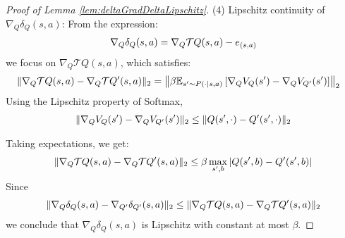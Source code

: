 \begin{proof}[Proof of Lemma \ref{lem:deltaGradDeltaLipschitz}]
\noindent (4) Lipschitz continuity of \( \nabla_Q \delta_Q(s,a) \):  
From the expression:
\begin{align}
    \nabla_Q \delta_Q(s,a) = \nabla_Q \mathcal{T}Q(s,a) - e_{(s,a)} \notag
\end{align}
we focus on \( \nabla_Q \mathcal{T}Q(s,a) \), which satisfies:
\begin{align}
    \|\nabla_Q \mathcal{T}Q(s,a) - \nabla_Q \mathcal{T}Q'(s,a)\|_2 &= \left\|\beta \mathbb{E}_{s' \sim P(\cdot \mid s,a)} \left[\nabla_Q V_Q(s') - \nabla_Q V_{Q'}(s') \right] \right\|_2 \notag
\end{align}
Using the Lipschitz property of Softmax,
\begin{align}
    \|\nabla_Q V_Q(s') - \nabla_Q V_{Q'}(s')\|_2 \leq \|Q(s',\cdot) - Q'(s',\cdot)\|_2 \notag
\end{align}


Taking expectations, we get:
\begin{align}
    \|\nabla_Q \mathcal{T}Q(s,a) - \nabla_Q \mathcal{T}Q'(s,a)\|_2 \leq \beta \max_{s',b} |Q(s',b) - Q'(s',b)| \notag
\end{align}
Since
\begin{align}
    \|\nabla_Q \delta_Q(s,a) - \nabla_{Q'} \delta_{Q'}(s,a)\|_2 \leq \|\nabla_Q \mathcal{T}Q(s,a) - \nabla_Q \mathcal{T}Q'(s,a)\|_2 \notag
\end{align}
we conclude that \( \nabla_Q \delta_Q(s,a) \) is Lipschitz with constant at most \( \beta \).



\end{proof}





